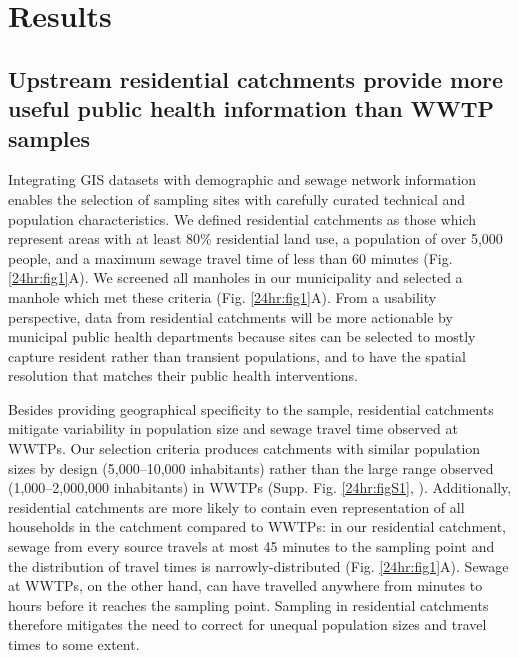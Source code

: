 \section{Results}

\subsection{Upstream residential catchments provide more useful public health information than WWTP samples}

Integrating GIS datasets with demographic and sewage network information enables the selection of sampling sites with carefully curated technical and population characteristics. We defined residential catchments as those which represent areas with at least 80\% residential land use, a population of over 5,000 people, and a maximum sewage travel time of less than 60 minutes (Fig. \ref{24hr:fig1}A). We screened all manholes in our municipality and selected a manhole which met these criteria (Fig. \ref{24hr:fig1}A). From a usability perspective, data from residential catchments will be more actionable by municipal public health departments because sites can be selected to mostly capture resident rather than transient populations, and to have the spatial resolution that matches their public health interventions.

Besides providing geographical specificity to the sample, residential catchments mitigate variability in population size and sewage travel time observed at WWTPs. Our selection criteria produces catchments with similar population sizes by design (5,000--10,000 inhabitants) rather than the large range observed (1,000--2,000,000 inhabitants) in WWTPs (Supp. Fig. \ref{24hr:figS1}, \cite{Newton2015}). Additionally, residential catchments are more likely to contain even representation of all households in the catchment compared to WWTPs: in our residential catchment, sewage from every source travels at most 45 minutes to the sampling point and the distribution of travel times is narrowly-distributed (Fig. \ref{24hr:fig1}A). Sewage at WWTPs, on the other hand, can have travelled anywhere from minutes to hours before it reaches the sampling point. Sampling in residential catchments therefore mitigates the need to correct for unequal population sizes and travel times to some extent.

